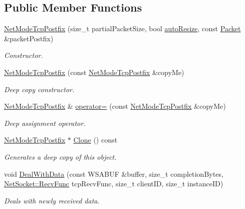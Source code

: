 \subsection*{Public Member Functions}
\begin{DoxyCompactItemize}
\item 
\hyperlink{class_net_mode_tcp_postfix_af8c9dc004a98adac022d0778ab14dfa4}{NetModeTcpPostfix} (size\_\-t partialPacketSize, bool \hyperlink{class_net_mode_tcp_ae1bb51196acb2d71e38ce60b0860a1fc}{autoResize}, const \hyperlink{class_packet}{Packet} \&packetPostfix)
\begin{DoxyCompactList}\small\item\em Constructor. \item\end{DoxyCompactList}\item 
\hyperlink{class_net_mode_tcp_postfix_a51766453e3566319c4da21c7de665b7a}{NetModeTcpPostfix} (const \hyperlink{class_net_mode_tcp_postfix}{NetModeTcpPostfix} \&copyMe)
\begin{DoxyCompactList}\small\item\em Deep copy constructor. \item\end{DoxyCompactList}\item 
\hyperlink{class_net_mode_tcp_postfix}{NetModeTcpPostfix} \& \hyperlink{class_net_mode_tcp_postfix_a6258feb426c5478ec752707a14095ea2}{operator=} (const \hyperlink{class_net_mode_tcp_postfix}{NetModeTcpPostfix} \&copyMe)
\begin{DoxyCompactList}\small\item\em Deep assignment operator. \item\end{DoxyCompactList}\item 
\hyperlink{class_net_mode_tcp_postfix}{NetModeTcpPostfix} $\ast$ \hyperlink{class_net_mode_tcp_postfix_a047ba1c68e01bb6bd6c8be083102626e}{Clone} () const 
\begin{DoxyCompactList}\small\item\em Generates a deep copy of this object. \item\end{DoxyCompactList}\item 
void \hyperlink{class_net_mode_tcp_postfix_a3e350f1ef706f2dbc7dabae0491b3797}{DealWithData} (const WSABUF \&buffer, size\_\-t completionBytes, \hyperlink{class_net_socket_a52b5f4de8d0a47fd8620f542b21c076c}{NetSocket::RecvFunc} tcpRecvFunc, size\_\-t clientID, size\_\-t instanceID)
\begin{DoxyCompactList}\small\item\em Deals with newly received data. \item\end{DoxyCompactList}\item 

\end{DoxyCompactItemize}

